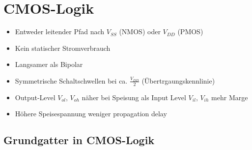 \section{CMOS-Logik}

\begin{itemize}
    \item Entweder leitender Pfad nach $V_{SS}$ (NMOS) oder $V_{DD}$ (PMOS)
    \item Kein statischer Stromverbrauch
    \item Langsamer als Bipolar
    \item Symmetrische Schaltschwellen bei ca. $\frac{V_{DD}}{2}$ (Übertrgaungskennlinie)
    \item Output-Level $V_{ol}$, $V_{oh}$ näher bei Speisung als Input Level $V_{il}$, $V_{ih}$ \textrightarrow mehr Marge
    \item Höhere Speisespannung \textrightarrow weniger propagation delay
\end{itemize}


\subsection{Grundgatter in CMOS-Logik}

